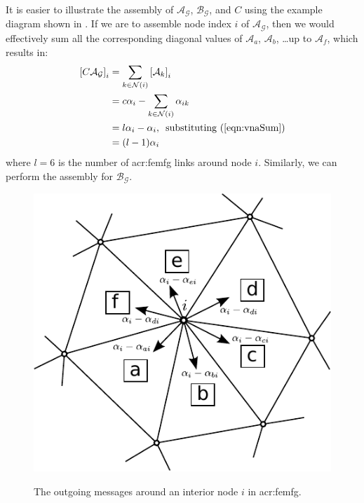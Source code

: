 It is easier to illustrate the assembly of $\mathcal{A}_{\mathcal{G}}$, $\mathcal{B}_{\mathcal{G}}$, and $C$ using the example diagram shown in .
If we are to assemble node index $i$ of $\mathcal{A}_{\mathcal{G}}$, then we would effectively sum all the corresponding diagonal values of $\mathcal{A}_a$, $\mathcal{A}_b$, \ldots up to $\mathcal{A}_f$, which results in:
\begin{align}
	\left[ C \mathcal{A}_{\mathcal{G}} \right]_i & = \sum_{k \in \mathcal{N}(i)} \left[ \mathcal{A}_k \right]_i\\
	& = c \alpha_i - \sum_{k \in \mathcal{N}(i)} \alpha_{ik}\\
	& = l \alpha_i - \alpha_i , \,\,\, \text{substituting \eqnRef{eqn:vnaSum}} \\
	& = (l-1) \alpha_i
\end{align}
where $l = 6$ is the number of \gls{acr:femfg} links around node $i$.
Similarly, we can perform the assembly for $\mathcal{B}_{\mathcal{G}}$.
\begin{figure}
	\centering
	{
	\includegraphics[scale=1.0]{glb_res}
	}
	\caption{The outgoing messages around an interior node $i$ in \acrshort{acr:femfg}.}
	\label{fig:nodalAssembly}
\end{figure}


